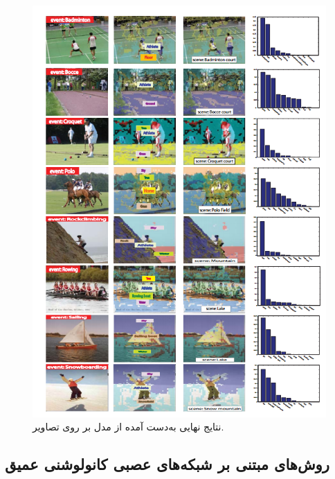 \begin{enumerate}
\begin{figure}[H]
\center
\includegraphics[height=0.8\textheight]{./Imgs/li2007and_res1.png}
\caption{نتایج نهایی به‌دست آمده از مدل بر روی تصاویر. \cite{li2007and}}
\label{fig:liR}
\end{figure}



%
%
%
%
%
\end{enumerate}

\subsection{روش‌های مبتنی بر شبکه‌های عصبی کانولوشنی عمیق}

